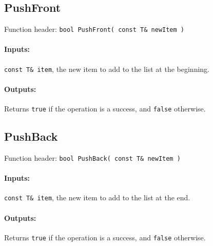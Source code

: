     \newpage
    
    \begin{framed}
    \subsection{PushFront}

    Function header: \texttt{bool    PushFront( const T\& newItem )}

    \paragraph{Inputs:}
        \texttt{const T\& item}, the new item to add to the list at the beginning.

    \paragraph{Outputs:}
        Returns \texttt{true} if the operation is a success, and \texttt{false} otherwise.

    \end{framed}
    
    \begin{framed}
    \subsection{PushBack}

    Function header: \texttt{bool    PushBack( const T\& newItem )}

    \paragraph{Inputs:}
        \texttt{const T\& item}, the new item to add to the list at the end.

    \paragraph{Outputs:}
        Returns \texttt{true} if the operation is a success, and \texttt{false} otherwise.

    \end{framed}
    
